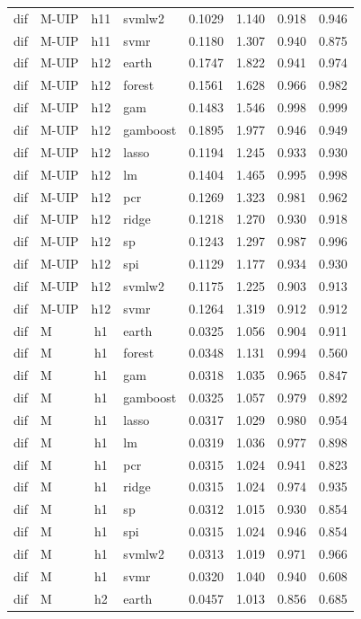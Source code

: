 \begin{ThreePartTable}
\begin{longtable}[t]{llclcccc}
dif & M-UIP & h11 & svmlw2 & 0.1029 & 1.140 & 0.918 & 0.946\\
dif & M-UIP & h11 & svmr & 0.1180 & 1.307 & 0.940 & 0.875\\
\addlinespace
dif & M-UIP & h12 & earth & 0.1747 & 1.822 & 0.941 & 0.974\\
dif & M-UIP & h12 & forest & 0.1561 & 1.628 & 0.966 & 0.982\\
dif & M-UIP & h12 & gam & 0.1483 & 1.546 & 0.998 & 0.999\\
dif & M-UIP & h12 & gamboost & 0.1895 & 1.977 & 0.946 & 0.949\\
dif & M-UIP & h12 & lasso & 0.1194 & 1.245 & 0.933 & 0.930\\
dif & M-UIP & h12 & lm & 0.1404 & 1.465 & 0.995 & 0.998\\
dif & M-UIP & h12 & pcr & 0.1269 & 1.323 & 0.981 & 0.962\\
dif & M-UIP & h12 & ridge & 0.1218 & 1.270 & 0.930 & 0.918\\
dif & M-UIP & h12 & sp & 0.1243 & 1.297 & 0.987 & 0.996\\
dif & M-UIP & h12 & spi & 0.1129 & 1.177 & 0.934 & 0.930\\
dif & M-UIP & h12 & svmlw2 & 0.1175 & 1.225 & 0.903 & 0.913\\
dif & M-UIP & h12 & svmr & 0.1264 & 1.319 & 0.912 & 0.912\\
\addlinespace
dif & M & h1 & earth & 0.0325 & 1.056 & 0.904 & 0.911\\
dif & M & h1 & forest & 0.0348 & 1.131 & 0.994 & 0.560\\
dif & M & h1 & gam & 0.0318 & 1.035 & 0.965 & 0.847\\
dif & M & h1 & gamboost & 0.0325 & 1.057 & 0.979 & 0.892\\
dif & M & h1 & lasso & 0.0317 & 1.029 & 0.980 & 0.954\\
dif & M & h1 & lm & 0.0319 & 1.036 & 0.977 & 0.898\\
dif & M & h1 & pcr & 0.0315 & 1.024 & 0.941 & 0.823\\
dif & M & h1 & ridge & 0.0315 & 1.024 & 0.974 & 0.935\\
dif & M & h1 & sp & 0.0312 & 1.015 & 0.930 & 0.854\\
dif & M & h1 & spi & 0.0315 & 1.024 & 0.946 & 0.854\\
dif & M & h1 & svmlw2 & 0.0313 & 1.019 & 0.971 & 0.966\\
dif & M & h1 & svmr & 0.0320 & 1.040 & 0.940 & 0.608\\
\addlinespace
dif & M & h2 & earth & 0.0457 & 1.013 & 0.856 & 0.685\\

\end{longtable}
\end{ThreePartTable}
